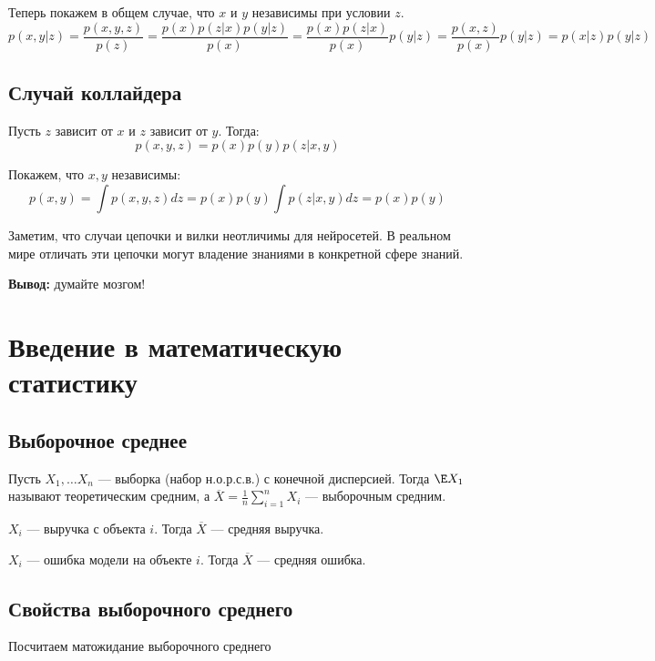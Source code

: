 Теперь покажем в общем случае, что \(x\) и \(y\) независимы при условии \(z\).
\[p(x, y|z) = \frac{p(x, y, z)}{p(z)} = \frac{p(x)p(z|x)p(y|z)}{p(x)} = \frac{p(x)p(z|x)}{p(x)}p(y|z) = \frac{p(x, z)}{p(x)}p(y|z) = p(x|z)p(y|z)\]

\subsection{Случай коллайдера}
Пусть \(z\) зависит от \(x\) и \(z\) зависит от \(y\). Тогда:
\[p(x, y, z) = p(x)p(y)p(z|x, y)\]

Покажем, что \(x, y\) независимы:
\[p(x, y) = \int p(x, y, z)dz = p(x)p(y)\int p(z|x, y)dz = p(x)p(y)\]

\begin{note}
    Заметим, что случаи цепочки и вилки неотличимы для нейросетей. В реальном мире отличать эти цепочки могут владение знаниями в конкретной сфере знаний. 
\end{note}

\textbf{Вывод:} думайте мозгом!


\section{Введение в математическую статистику}

\subsection{Выборочное среднее}
Пусть \(X_1, \dots X_n\) --- выборка (набор н.о.р.с.в.) с конечной дисперсией. Тогда \(\E X_1\) называют теоретическим средним, а \(\overline{X} = \frac{1}{n}\sum_{i = 1}^n X_i\) --- выборочным средним.

\begin{example}
    \(X_i\) --- выручка с объекта \(i\). Тогда \(\overline{X}\) --- средняя выручка.
\end{example}

\begin{example}
    \(X_i\) --- ошибка модели на объекте \(i\). Тогда \(\overline{X}\) --- средняя ошибка.
\end{example}

\subsection{Свойства выборочного среднего}

Посчитаем матожидание выборочного среднего

